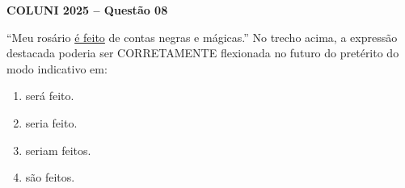 \textbf{COLUNI 2025 -- Questão 08}\par\medskip “Meu rosário \underline{é feito} de contas negras e mágicas.” No trecho acima, a expressão destacada poderia ser CORRETAMENTE flexionada no futuro do pretérito do modo indicativo em:\begin{enumerate}
\item será feito.
\item seria feito.
\item seriam feitos.
\item são feitos.\end{enumerate}
